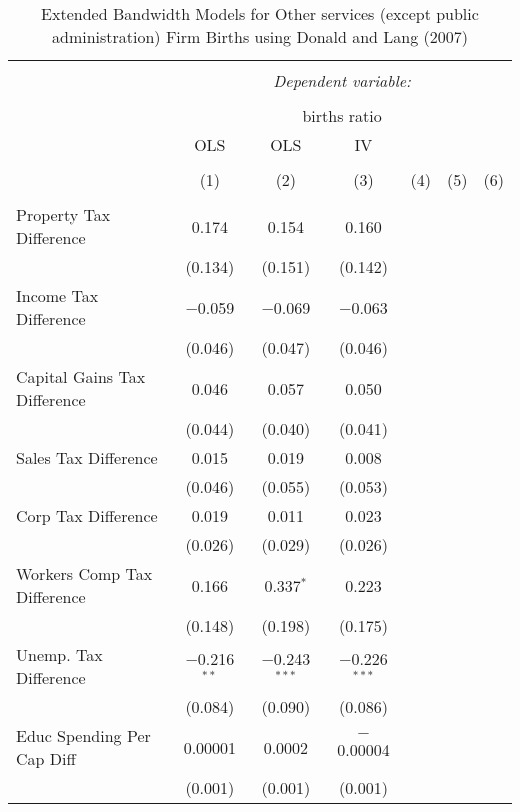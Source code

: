 
\begin{table}[!htbp] \centering 
  \caption{Extended Bandwidth Models for  Other services (except public administration) Firm Births using Donald and Lang (2007)} 
  \label{} 
\begin{tabular}{@{\extracolsep{5pt}}lcccccc} 
\\[-1.8ex]\hline 
\hline \\[-1.8ex] 
 & \multicolumn{6}{c}{\textit{Dependent variable:}} \\ 
\cline{2-7} 
\\[-1.8ex] & \multicolumn{6}{c}{births ratio} \\ 
 & OLS & OLS & IV &  &  &  \\ 
\\[-1.8ex] & (1) & (2) & (3) & (4) & (5) & (6)\\ 
\hline \\[-1.8ex] 
 Property Tax Difference & 0.174 & 0.154 & 0.160 &  &  &  \\ 
  & (0.134) & (0.151) & (0.142) &  &  &  \\ 
  Income Tax Difference & $-$0.059 & $-$0.069 & $-$0.063 &  &  &  \\ 
  & (0.046) & (0.047) & (0.046) &  &  &  \\ 
  Capital Gains Tax Difference & 0.046 & 0.057 & 0.050 &  &  &  \\ 
  & (0.044) & (0.040) & (0.041) &  &  &  \\ 
  Sales Tax Difference & 0.015 & 0.019 & 0.008 &  &  &  \\ 
  & (0.046) & (0.055) & (0.053) &  &  &  \\ 
  Corp Tax Difference & 0.019 & 0.011 & 0.023 &  &  &  \\ 
  & (0.026) & (0.029) & (0.026) &  &  &  \\ 
  Workers Comp Tax Difference & 0.166 & 0.337$^{*}$ & 0.223 &  &  &  \\ 
  & (0.148) & (0.198) & (0.175) &  &  &  \\ 
  Unemp. Tax Difference & $-$0.216$^{**}$ & $-$0.243$^{***}$ & $-$0.226$^{***}$ &  &  &  \\ 
  & (0.084) & (0.090) & (0.086) &  &  &  \\ 
  Educ Spending Per Cap Diff & 0.00001 & 0.0002 & $-$0.00004 &  &  &  \\ 
  & (0.001) & (0.001) & (0.001) &  &  &  \\ 

\end{tabular}
\end{table}
